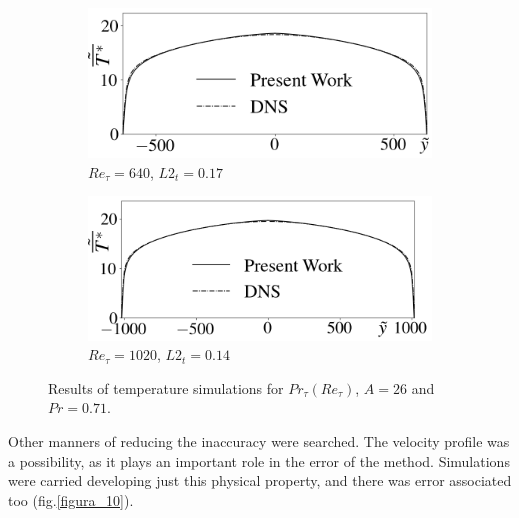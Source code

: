\documentclass[10pt]{article} %
\begin{document}
\begin{figure}[!h]
\begin{subfigure}[t]{0.5\textwidth}
		\centering
		\includegraphics[angle=0, scale=0.24]{fotos_formatacao_final/Temperature_640_071_Prt(Ret)_A26}
		\caption{$Re_\tau = 640$, $L2_t = 0.17$}
	\end{subfigure}
	\begin{subfigure}[t]{0.45\textwidth}
		\centering
		\includegraphics[angle=0, scale=0.24]{fotos_formatacao_final/Temperature_1000_071_Prt(Ret)_A26}
		\caption{$Re_\tau = 1020$, $L2_t = 0.14$}
	\end{subfigure}	
	\caption{Results of temperature simulations for $Pr_\tau(Re_\tau)$, $A = 26$ and $Pr =0.71$. }
	\label{figura_9}
\end{figure}



\newpage

Other manners of reducing the inaccuracy were searched. The velocity profile was a possibility, as it plays an important role in the error of the method. Simulations were carried developing just this physical property, and there was error associated too (fig.\ref{figura_10}).
\end{document}
